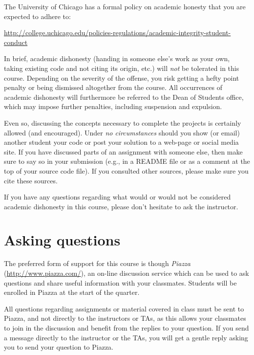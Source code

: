 \documentclass[11pt]{article}
\begin{document}
The University of Chicago has a formal policy on academic honesty that you are expected to adhere to:

\begin{center}
\url{http://college.uchicago.edu/policies-regulations/academic-integrity-student-conduct}
\end{center}

In brief, academic dishonesty (handing in someone else's work as your own, taking existing code and not citing its origin, etc.) will \emph{not} be tolerated in this course. Depending on the severity of the offense, you risk getting a hefty point penalty or being dismissed altogether from the course. All occurrences of academic dishonesty will furthermore be referred to the Dean of Students office, which may impose further penalties, including suspension and expulsion.

Even so, discussing the concepts necessary to complete the projects is certainly allowed (and encouraged).  Under \emph{no circumstances} should you show (or email) another student your code or post your solution to a web-page or social media site.  If you have discussed parts of an assignment with someone else, then make sure to say so in your submission (e.g., in a README file or as a comment at the top of your source code file). If you consulted other sources, please make sure you cite these sources.

If you have any questions regarding what would or would not be considered academic dishonesty in this course, please don't hesitate to ask the instructor.


\section{Asking questions}
\label{asking}

The preferred form of support for this course is though \emph{Piazza} (\url{http://www.piazza.com/}), an on-line discussion service which can be used to ask questions and share useful information with your classmates. Students will be enrolled in Piazza at the start of the quarter.

All questions regarding assignments or material covered in class must be sent to Piazza, and not directly to the instructors or TAs, as this allows your classmates to join in the discussion and benefit from the replies to your question. If you send a message directly to the instructor or the TAs, you will get a gentle reply asking you to send your question to Piazza. 
\end{document}
